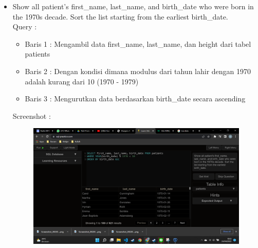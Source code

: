 \documentclass[]{article}
\begin{document}
\begin{itemize}
        \item Show all patient's first\_name, last\_name, and birth\_date who were born in the 1970s decade. Sort the list starting from the earliest birth\_date.
        \\Query :
        
        \begin{itemize}
            \item Baris 1 : Mengambil data first\_name, last\_name, dan height dari tabel patients
            \item Baris 2 : Dengan kondisi dimana modulus dari tahun lahir dengan 1970 adalah kurang dari 10 (1970 - 1979)
            \item Baris 3 : Mengurutkan data berdasarkan birth\_date secara ascending
        \end{itemize}
        \pagebreak
        Screenshot :
        \begin{figure}[h]
            \includegraphics[scale=0.3]{./Screenshot/Medium-12.png}
            \centering
        \end{figure}


\end{itemize}
\end{document}

